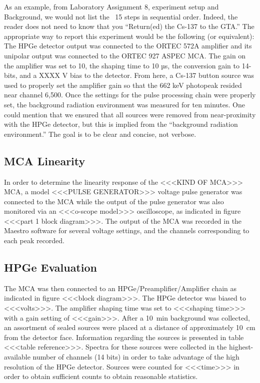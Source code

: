 \documentclass[12pt]{article}
\begin{document}
As an example, from Laboratory Assignment 8, experiment setup and Background, we would not list the ~15 steps in sequential order. Indeed, the reader does not need to know that you “Return(ed) the Cs-137 to the GTA.” The appropriate way to report this experiment would be the following (or equivalent): The HPGe detector output was connected to the ORTEC 572A amplifier and its unipolar output was connected to the ORTEC 927 ASPEC MCA. The gain on the amplifier was set to 10, the shaping time to 10 µs, the conversion gain to 14-bits, and a XXXX V bias to the detector. From here, a Cs-137 button source was used to properly set the amplifier gain so that the 662 keV photopeak resided near channel 6,500. Once the settings for the pulse processing chain were properly set, the background radiation environment was measured for ten minutes. One could mention that we ensured that all sources were removed from near-proximity with the HPGe detector, but this is implied from the “background radiation environment.” The goal is to be clear and concise, not verbose. 

\subsection{MCA Linearity}
In order to determine the linearity response of the <<<KIND OF MCA>>> MCA, a model <<<PULSE GENERATOR>>> voltage pulse generator was connected to the MCA while the output of the pulse generator was also monitored via an <<<o-scope model>>> oscilloscope, as indicated in figure <<<part 1 block diagram>>>. The output of the MCA was recorded in the Maestro software for several voltage settings, and the channels corresponding to each peak recorded.

\subsection{HPGe Evaluation}
The MCA was then connected to an HPGe/Preamplifier/Amplifier chain as indicated in figure <<<block diagram>>>. The HPGe detector was biased to <<<volts>>>. The amplifier shaping time was set to <<<shaping time>>> with a gain setting of <<<gain>>>. After a \SI{10}{\minute} background was collected, an assortment of sealed sources were placed at a distance of approximately \SI{10}{\centi\meter} from the detector face. Information regarding the sources is presented in table <<<table reference>>>. Spectra for these sources were collected in the highest-available number of channels (14 bits) in order to take advantage of the high resolution of the HPGe detector. Sources were counted for <<<time>>> in order to obtain sufficient counts to obtain reasonable statistics.
\end{document}
